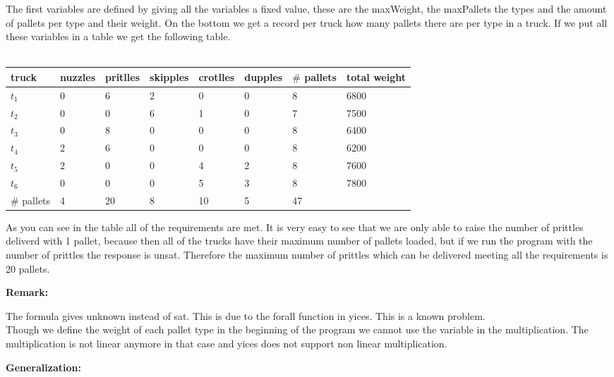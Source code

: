 \documentclass[12pt]{article}
\begin{document}
\noindent The first variables are defined by giving all the variables a fixed value, these are the maxWeight, the maxPallets the types and the amount of pallets per type and their weight. On the bottom we get a record per truck how many pallets there are per type in a truck. If we put all these variables in a table we get the following table.\\
\\
\begin{tabular}{| l | l | l | l | l | l | l | l |}
\hline
truck	& nuzzles	& pritlles	& skipples	& crotlles	& dupples & $\#$ pallets & total weight\\
\hline
$t_1$	& 0	&	6	&	2	&	0	&	0	& 8 & 6800\\
$t_2$	& 0	&	0	&	6	&	1	&	0	& 7 & 7500\\
$t_3$	& 0	&	8	&	0	&	0	&	0	& 8 & 6400\\
$t_4$	& 2	&	6	&	0	&	0	&	0	& 8 & 6200\\
$t_5$	& 2	&	0	&	0	&	4	&	2	& 8 & 7600\\
$t_6$	& 0	&	0	&	0	&	5	&	3	& 8 & 7800\\
\hline
$\#$ pallets	&	4	&	20	&	8	&	10	&	5	&  47	&\\
\hline
\end{tabular}

\vspace{3mm}

\noindent As you can see in the table all of the requirements are met. It is very easy to see that we are only able to raise the number of prittles deliverd with 1 pallet, because then all of the trucks have their maximum number of pallets loaded, but if we run the program with the number of prittles the response is unsat. Therefore the maximum number of prittles which can be delivered meeting all the requirements is 20 pallets.

\vspace{3mm}

{\bf Remark:} 

\noindent The formula gives unknown instead of sat. This is due to the forall function in yices. This is a known problem.\\
Though we define the weight of each pallet type in the beginning of the program we cannot use the variable in the multiplication.
The multiplication is not linear anymore in that case and yices does not support non linear multiplication.

\vspace{3mm}

{\bf Generalization:} 
\end{document}

